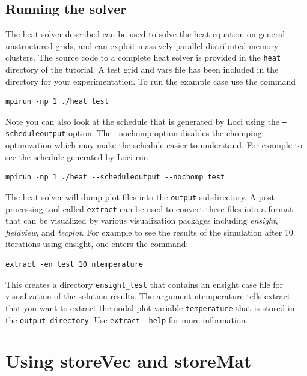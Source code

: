 \documentclass[10pt,epsf,letterpaper,twoside]{book}
\begin{document}
\section{Running the solver}

The heat solver described can be used to solve the heat equation on
general unstructured grids, and can exploit massively parallel
distributed memory clusters.  The source code to a complete heat
solver is provided in the {\tt heat} directory of the tutorial.  A
test grid and vars file has been included in the directory for your
experimentation.  To run the example case use the command
\begin{verbatim}
mpirun -np 1 ./heat test
\end{verbatim}

Note you can also look at the schedule that is generated by Loci using
the {\tt --scheduleoutput} option.  The {--nochomp} option disables
the chomping optimization which may make the schedule easier to
understand.  For example to see the schedule generated by Loci run
\begin{verbatim}
mpirun -np 1 ./heat --scheduleoutput --nochomp test
\end{verbatim}

The heat solver will dump plot files into the {\tt output}
subdirectory. A post-processing tool called {\tt extract} can be used
to convert these files into a format that can be visualized by various
visualization packages including {\it ensight}, {\it fieldview}, and
{\it tecplot}.  For example to see the results of the simulation after
10 iterations using ensight, one enters the command:
\begin{verbatim}
extract -en test 10 ntemperature
\end{verbatim}
This creates a directory {\tt ensight\_test} that contains an ensight case
file for visualization of the solution results.  The argument
ntemperature tells extract that you want to extract the nodal plot
variable {\tt temperature} that is stored in the {\tt output
  directory}.  Use {\tt extract -help} for more information.

\chapter{Using storeVec and storeMat}
\end{document}
